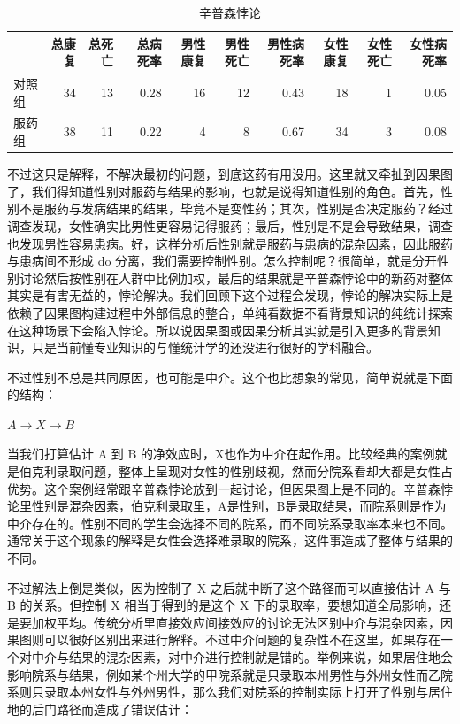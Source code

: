 \documentclass[]{tufte-book}
\begin{document}
\begin{table}

\caption{\label{tab:unnamed-chunk-15}辛普森悖论}
\centering
\begin{tabular}[t]{lrrrrrrrrr}
\toprule
  & 总康复 & 总死亡 & 总病死率 & 男性康复 & 男性死亡 & 男性病死率 & 女性康复 & 女性死亡 & 女性病死率\\
\midrule
对照组 & 34 & 13 & 0.28 & 16 & 12 & 0.43 & 18 & 1 & 0.05\\
服药组 & 38 & 11 & 0.22 & 4 & 8 & 0.67 & 34 & 3 & 0.08\\
\bottomrule
\end{tabular}
\end{table}

不过这只是解释，不解决最初的问题，到底这药有用没用。这里就又牵扯到因果图了，我们得知道性别对服药与结果的影响，也就是说得知道性别的角色。首先，性别不是服药与发病结果的结果，毕竟不是变性药；其次，性别是否决定服药？经过调查发现，女性确实比男性更容易记得服药；最后，性别是不是会导致结果，调查也发现男性容易患病。好，这样分析后性别就是服药与患病的混杂因素，因此服药与患病间不形成 do 分离，我们需要控制性别。怎么控制呢？很简单，就是分开性别讨论然后按性别在人群中比例加权，最后的结果就是辛普森悖论中的新药对整体其实是有害无益的，悖论解决。我们回顾下这个过程会发现，悖论的解决实际上是依赖了因果图构建过程中外部信息的整合，单纯看数据不看背景知识的纯统计探索在这种场景下会陷入悖论。所以说因果图或因果分析其实就是引入更多的背景知识，只是当前懂专业知识的与懂统计学的还没进行很好的学科融合。

不过性别不总是共同原因，也可能是中介。这个也比想象的常见，简单说就是下面的结构：

\(A \rightarrow X \rightarrow B\)

当我们打算估计 A 到 B 的净效应时，X也作为中介在起作用。比较经典的案例就是伯克利录取问题，整体上呈现对女性的性别歧视，然而分院系看却大都是女性占优势。这个案例经常跟辛普森悖论放到一起讨论，但因果图上是不同的。辛普森悖论里性别是混杂因素，伯克利录取里，A是性别，B是录取结果，而院系则是作为中介存在的。性别不同的学生会选择不同的院系，而不同院系录取率本来也不同。通常关于这个现象的解释是女性会选择难录取的院系，这件事造成了整体与结果的不同。

不过解法上倒是类似，因为控制了 X 之后就中断了这个路径而可以直接估计 A 与 B 的关系。但控制 X 相当于得到的是这个 X 下的录取率，要想知道全局影响，还是要加权平均。传统分析里直接效应间接效应的讨论无法区别中介与混杂因素，因果图则可以很好区别出来进行解释。不过中介问题的复杂性不在这里，如果存在一个对中介与结果的混杂因素，对中介进行控制就是错的。举例来说，如果居住地会影响院系与结果，例如某个州大学的甲院系就是只录取本州男性与外州女性而乙院系则只录取本州女性与外州男性，那么我们对院系的控制实际上打开了性别与居住地的后门路径而造成了错误估计：
\end{document}
